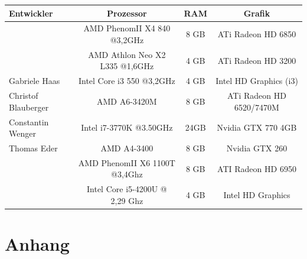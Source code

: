\documentclass[10pt]{scrreprt}
\begin{document}
\begin{tabular}{|l|c|c|c|}
\hline
\rule[-1ex]{0pt}{4ex}\textsf{\textbf{Entwickler}} & \textsf{\textbf{Prozessor}} & \textsf{\textbf{RAM}} & \textsf{\textbf{Grafik}} \\
\hline
\hline
\rule[-1ex]{0pt}{4ex}\multirow{2}{*}{Fabian Knorr} & AMD PhenomII X4 840 @3,2GHz & 8 GB & ATi Radeon HD 6850 \\
\rule[-1ex]{0pt}{2ex} & AMD Athlon Neo X2 L335 @1,6GHz & 4 GB & ATi Radeon HD 3200 \\
\hline
\rule[-1ex]{0pt}{4ex}Gabriele Haas & Intel Core i3 550 @3,2GHz & 4 GB & Intel HD Graphics (i3) \\
\hline
\rule[-1ex]{0pt}{4ex}Christof Blauberger & AMD A6-3420M & 8 GB & ATi Radeon HD 6520/7470M \\
\hline
\rule[-1ex]{0pt}{4ex}Constantin Wenger & Intel i7-3770K @3.50GHz & 24GB & Nvidia GTX 770 4GB \\
\hline
\rule[-1ex]{0pt}{4ex}Thomas Eder & AMD A4-3400 & 8 GB & Nvidia GTX 260 \\
\hline
\rule[-1ex]{0pt}{4ex}\multirow{2}{*}{Sebastian Reichl} & AMD PhenomII X6 1100T @3,4Ghz & 8 GB & ATI Radeon HD 6950 \\
\rule[-1ex]{0pt}{2ex}& Intel Core i5-4200U @ 2,29 Ghz & 4 GB & Intel HD Graphics \\
\hline
\end{tabular}

\vspace{0.5cm}



\chapter{Anhang}
\end{document}
